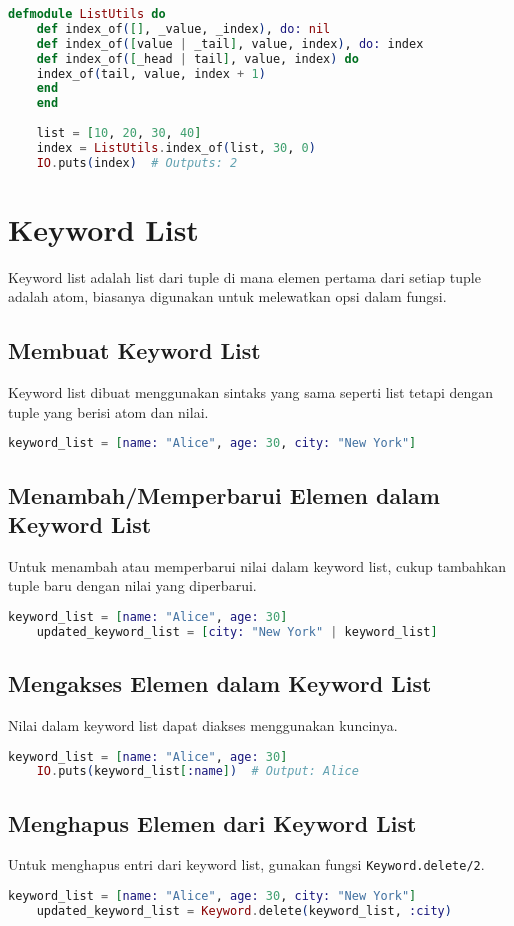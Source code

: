 \begin{lstlisting}[language=Elixir]
	defmodule ListUtils do
	def index_of([], _value, _index), do: nil
	def index_of([value | _tail], value, index), do: index
	def index_of([_head | tail], value, index) do
	index_of(tail, value, index + 1)
	end
	end
	
	list = [10, 20, 30, 40]
	index = ListUtils.index_of(list, 30, 0)
	IO.puts(index)  # Outputs: 2
\end{lstlisting}


\section{Keyword List}
Keyword list adalah list dari tuple di mana elemen pertama dari setiap tuple adalah atom, biasanya digunakan untuk melewatkan opsi dalam fungsi.

\subsection{Membuat Keyword List}
Keyword list dibuat menggunakan sintaks yang sama seperti list tetapi dengan tuple yang berisi atom dan nilai.
\begin{lstlisting}[language=Elixir]
	keyword_list = [name: "Alice", age: 30, city: "New York"]
\end{lstlisting}

\subsection{Menambah/Memperbarui Elemen dalam Keyword List}
Untuk menambah atau memperbarui nilai dalam keyword list, cukup tambahkan tuple baru dengan nilai yang diperbarui.
\begin{lstlisting}[language=Elixir]
	keyword_list = [name: "Alice", age: 30]
	updated_keyword_list = [city: "New York" | keyword_list]
\end{lstlisting}

\subsection{Mengakses Elemen dalam Keyword List}
Nilai dalam keyword list dapat diakses menggunakan kuncinya.
\begin{lstlisting}[language=Elixir]
	keyword_list = [name: "Alice", age: 30]
	IO.puts(keyword_list[:name])  # Output: Alice
\end{lstlisting}

\subsection{Menghapus Elemen dari Keyword List}
Untuk menghapus entri dari keyword list, gunakan fungsi \texttt{Keyword.delete/2}.
\begin{lstlisting}[language=Elixir]
	keyword_list = [name: "Alice", age: 30, city: "New York"]
	updated_keyword_list = Keyword.delete(keyword_list, :city)
\end{lstlisting}


